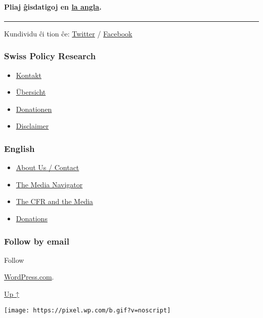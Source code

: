 \hypertarget{pliaj-ux11disdatigoj-en-la-angla}{%
\paragraph{\texorpdfstring{Pliaj ĝisdatigoj en
\href{https://swprs.org/a-swiss-doctor-on-covid-19/}{la
angla}.}{Pliaj ĝisdatigoj en la angla.}}\label{pliaj-ux11disdatigoj-en-la-angla}}

\begin{center}\rule{0.5\linewidth}{\linethickness}\end{center}

Kundividu ĉi tion ĉe:
\href{https://twitter.com/intent/tweet?url=https://swprs.org/faktoj-pri-kovim-19/}{Twitter}
/
\href{https://www.facebook.com/share.php?u=https://swprs.org/faktoj-pri-kovim-19/}{Facebook}

\hypertarget{swiss-policy-research}{%
\subsubsection{Swiss Policy Research}\label{swiss-policy-research}}

\begin{itemize}
\tightlist
\item
  \href{https://swprs.org/kontakt/}{Kontakt}
\item
  \href{https://swprs.org/uebersicht/}{Übersicht}
\item
  \href{https://swprs.org/donationen/}{Donationen}
\item
  \href{https://swprs.org/disclaimer/}{Disclaimer}
\end{itemize}

\hypertarget{english}{%
\subsubsection{English}\label{english}}

\begin{itemize}
\tightlist
\item
  \href{https://swprs.org/contact/}{About Us / Contact}
\item
  \href{https://swprs.org/media-navigator/}{The Media Navigator}
\item
  \href{https://swprs.org/the-american-empire-and-its-media/}{The CFR
  and the Media}
\item
  \href{https://swprs.org/donations/}{Donations}
\end{itemize}

\hypertarget{follow-by-email}{%
\subsubsection{Follow by email}\label{follow-by-email}}

Follow

\href{https://wordpress.com/?ref=footer_custom_com}{WordPress.com}.

\protect\hyperlink{}{Up ↑}

\texttt{[image: https://pixel.wp.com/b.gif?v=noscript]}
